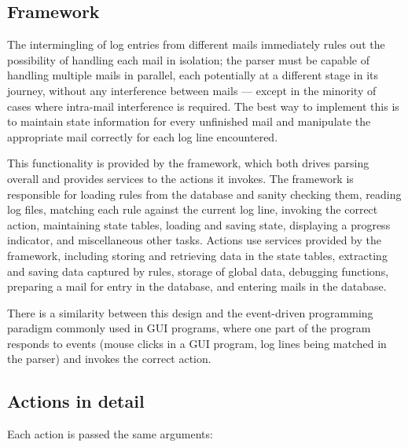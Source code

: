 \documentclass[a4paper,12pt,draft]{article}
\begin{document}
\subsection{Framework}

\label{framework}

The intermingling of log entries from different mails immediately rules out
the possibility of handling each mail in isolation; the parser must be
capable of handling multiple mails in parallel, each potentially at a
different stage in its journey, without any interference between mails ---
except in the minority of cases where intra-mail interference is required.
The best way to implement this is to maintain state information for every
unfinished mail and manipulate the appropriate mail correctly for each log
line encountered.

This functionality is provided by the framework, which both drives parsing
overall and provides services to the actions it invokes.  The framework is
responsible for loading rules from the database and sanity checking them,
reading log files, matching each rule against the current log line,
invoking the correct action, maintaining state tables, loading and saving
state, displaying a progress indicator, and miscellaneous other tasks.
Actions use services provided by the framework, including storing and
retrieving data in the state tables, extracting and saving data captured by
rules, storage of global data, debugging functions, preparing a mail for
entry in the database, and entering mails in the database.

There is a similarity between this design and the event-driven programming
paradigm commonly used in GUI programs, where one part of the program
responds to events (mouse clicks in a GUI program, log lines being matched
in the parser) and invokes the correct action.

\subsection{Actions in detail}

\label{actions-in-detail}

Each action is passed the same arguments:
\end{document}
